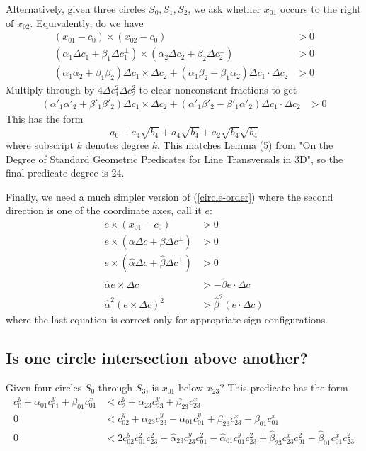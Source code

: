 \documentclass[11pt]{article}
\begin{document}
{Alternatively, given three circles $S_0, S_1, S_2$, we ask whether $x_{01}$ occurs to the right of $x_{02}$.  Equivalently, do we have
\begin{align*}
(x_{01} - c_0) \times (x_{02} - c_0) &> 0 \\
(\alpha_1 \Delta c_1 + \beta_1 \Delta c_1^\perp) \times (\alpha_2 \Delta c_2 + \beta_2 \Delta c_2^\perp) &> 0 \\
(\alpha_1 \alpha_2 + \beta_1 \beta_2) \Delta c_1 \times \Delta c_2 + (\alpha_1 \beta_2 - \beta_1 \alpha_2) \Delta c_1 \cdot \Delta c_2 &> 0
\end{align*}
Multiply through by $4 \Delta c_1^2 \Delta c_2^2$ to clear nonconstant fractions to get
\begin{align} \label{circle-order}
(\alpha'_1 \alpha'_2 + \beta'_1 \beta'_2) \Delta c_1 \times \Delta c_2 + (\alpha'_1 \beta'_2 - \beta'_1 \alpha'_2) \Delta c_1 \cdot \Delta c_2 &> 0
\end{align}
This has the form
$$a_6 + a_4 \sqrt{b_4} + a_4 \sqrt{b_4} + a_2 \sqrt{b_4} \sqrt{b_4}$$
where subscript $k$ denotes degree $k$.  This matches Lemma (5) from "On the Degree of Standard Geometric Predicates for Line Transversals in 3D", so the final predicate degree is 24.

Finally, we need a much simpler version of (\ref{circle-order}) where the second direction is one of the coordinate axes, call it $e$:
\begin{align*}
e \times (x_{01} - c_0) &> 0 \\
e \times (\alpha \Delta c + \beta \Delta c^\perp) &> 0 \\
e \times (\hat{\alpha} \Delta c + \hat{\beta} \Delta c^\perp) &> 0 \\
\hat{\alpha} e \times \Delta c &> -\hat{\beta} e \cdot \Delta c \\
\hat{\alpha}^2 (e \times \Delta c)^2 &> \hat{\beta}^2 (e \cdot \Delta c)
\end{align*}
where the last equation is correct only for appropriate sign configurations.

\subsection{Is one circle intersection above another?}

Given four circles $S_0$ through $S_3$, is $x_{01}$ below $x_{23}$?  This predicate has the form
\begin{align*}
c_0^y + \alpha_{01} c_{01}^y + \beta_{01} c_{01}^x &< c_2^y + \alpha_{23} c_{23}^y + \beta_{23} c_{23}^x \\
0 &< c_{02}^y + \alpha_{23} c_{23}^y - \alpha_{01} c_{01}^y + \beta_{23} c_{23}^x - \beta_{01} c_{01}^x \\
0 &< 2 c_{02}^y c_{01}^2 c_{23}^2 + \hat{\alpha}_{23} c_{23}^y c_{01}^2 - \hat{\alpha}_{01} c_{01}^y c_{23}^2 + \hat{\beta}_{23} c_{23}^x c_{01}^2 - \hat{\beta}_{01} c_{01}^x c_{23}^2
\end{align*}

}
\end{document}
